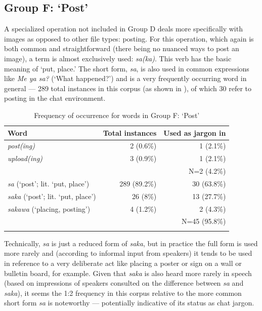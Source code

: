 \documentclass[output=paper,newtxmath,modfonts,nonflat,hidelinks]{langsci/langscibook}
\begin{document}
\subsection{Group F: ‘Post’}

A specialized operation not included in Group D deals more specifically with images as opposed to other file types: posting. For this operation, which again is both common and straightforward (there being no nuanced ways to post an image), a  term is almost exclusively used: \textit{sa(ka)}. This verb has the basic meaning of ‘put, place.’ The short form, \textit{sa}, is also used in common expressions like \textit{Me ya sa?} (‘What happened?’) and is a very frequently occurring word in general — 289 total instances in this corpus (as shown in ), of which 30 refer to posting in the chat environment. 

\begin{table}
\begin{tabularx}{\textwidth}{Qrr}
\lsptoprule
Word & Total instances & Used as jargon in \\
\midrule
\textit{post(ing)}   & 2 (0.6\%) & 1 (2.1\%)\\
\textit{upload(ing)} & 3 (0.9\%) & 1 (2.1\%)\\\midrule
& & N=2 (4.2\%)\\\midrule
\textit{sa} (‘post’; lit. ‘put, place’)   & 289 (89.2\%) & 30 (63.8\%)\\
\textit{saka} (‘post’; lit. ‘put, place’) & 26 (8\%) & 13 (27.7\%)\\
\textit{sakawa} (‘placing, posting’)      & 4 (1.2\%) & 2 (4.3\%)\\\midrule
& & N=45 (95.8\%)\\
\lspbottomrule
\end{tabularx}
\caption{Frequency of occurrence for words in Group F: ‘Post’}
\label{tab:purvis:8}
\end{table} 

Technically, \textit{sa} is just a reduced form of \textit{saka}, but in practice the full form is used more rarely and (according to informal input from  speakers) it tends to be used in reference to a very deliberate act like placing a poster or sign on a wall or bulletin board, for example. Given that \textit{saka} is also heard more rarely in speech (based on impressions of  speakers consulted on the difference between \textit{sa} and \textit{saka}), it seems the 1:2 frequency in this corpus relative to the more common short form \textit{sa} is noteworthy — potentially indicative of its status as chat jargon.
\end{document}
